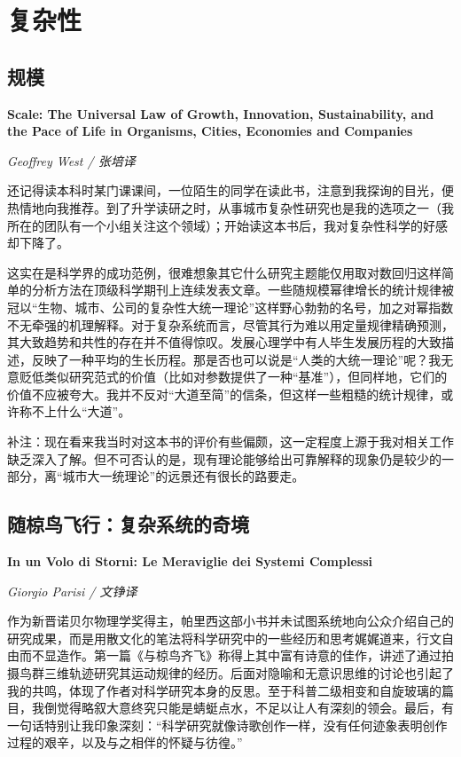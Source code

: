 \section{复杂性}

\subsection*{规模}
\par \textbf{Scale: The Universal Law of Growth, Innovation, Sustainability, and the Pace of Life in Organisms, Cities, Economies and Companies}
\par \emph{Geoffrey West / 张培译} 

\par 还记得读本科时某门课课间，一位陌生的同学在读此书，注意到我探询的目光，便热情地向我推荐。到了升学读研之时，从事城市复杂性研究也是我的选项之一（我所在的团队有一个小组关注这个领域）；开始读这本书后，我对复杂性科学的好感却下降了。
\par 这实在是科学界的成功范例，很难想象其它什么研究主题能仅用取对数回归这样简单的分析方法在顶级科学期刊上连续发表文章。一些随规模幂律增长的统计规律被冠以“生物、城市、公司的复杂性大统一理论”这样野心勃勃的名号，加之对幂指数不无牵强的机理解释。对于复杂系统而言，尽管其行为难以用定量规律精确预测，其大致趋势和共性的存在并不值得惊叹。发展心理学中有人毕生发展历程的大致描述，反映了一种平均的生长历程。那是否也可以说是“人类的大统一理论”呢？我无意贬低类似研究范式的价值（比如对参数提供了一种“基准”），但同样地，它们的价值不应被夸大。我并不反对“大道至简”的信条，但这样一些粗糙的统计规律，或许称不上什么“大道”。
\par {}

\par 补注：现在看来我当时对这本书的评价有些偏颇，这一定程度上源于我对相关工作缺乏深入了解。但不可否认的是，现有理论能够给出可靠解释的现象仍是较少的一部分，离“城市大一统理论”的远景还有很长的路要走。
\par {}

\subsection*{随椋鸟飞行：复杂系统的奇境}
\par \textbf{In un Volo di Storni: Le Meraviglie dei Systemi Complessi}
\par \emph{Giorgio Parisi / 文铮译} 

\par 作为新晋诺贝尔物理学奖得主，帕里西这部小书并未试图系统地向公众介绍自己的研究成果，而是用散文化的笔法将科学研究中的一些经历和思考娓娓道来，行文自由而不显造作。第一篇《与椋鸟齐飞》称得上其中富有诗意的佳作，讲述了通过拍摄鸟群三维轨迹研究其运动规律的经历。后面对隐喻和无意识思维的讨论也引起了我的共鸣，体现了作者对科学研究本身的反思。至于科普二级相变和自旋玻璃的篇目，我倒觉得略叙大意终究只能是蜻蜓点水，不足以让人有深刻的领会。最后，有一句话特别让我印象深刻：“科学研究就像诗歌创作一样，没有任何迹象表明创作过程的艰辛，以及与之相伴的怀疑与彷徨。”
\par {}

